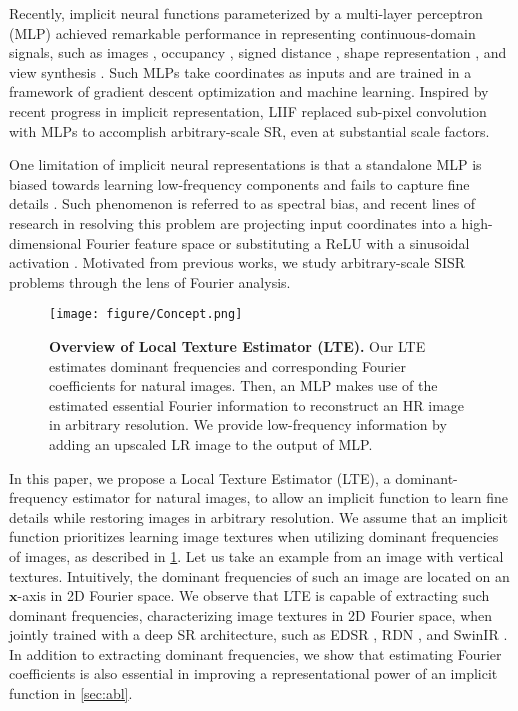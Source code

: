 \documentclass[10pt,twocolumn,letterpaper]{article}
\begin{document}
Recently, implicit neural functions parameterized by a multi-layer perceptron (MLP) achieved remarkable performance in representing continuous-domain signals, such as images \cite{chen2021learning}, occupancy \cite{Occupancy_Networks}, signed distance \cite{Park_2019_CVPR}, shape representation \cite{Local_Implicit_Grid_CVPR20}, and view synthesis \cite{sitzmann2019srns,mildenhall2020nerf}. Such MLPs take coordinates as inputs and are trained in a framework of gradient descent optimization and machine learning. Inspired by recent progress in implicit representation, LIIF \cite{chen2021learning} replaced sub-pixel convolution with MLPs to accomplish arbitrary-scale SR, even at substantial scale factors.

One limitation of implicit neural representations is that a standalone MLP is biased towards learning low-frequency components \cite{DBLP:conf/icml/RahamanBADLHBC19} and fails to capture fine details \cite{tancik2020fourfeat}. Such phenomenon is referred to as spectral bias, and recent lines of research in resolving this problem are projecting input coordinates into a high-dimensional Fourier feature space \cite{mildenhall2020nerf, tancik2020fourfeat} or substituting a ReLU with a sinusoidal activation \cite{sitzmann2019siren}. Motivated from previous works, we study arbitrary-scale SISR problems through the lens of Fourier analysis.






\begin{figure}[t]
\centering
\texttt{[image: figure/Concept.png]}
\vspace{-10pt}
\caption{\textbf{Overview of Local Texture Estimator (LTE).} Our LTE estimates dominant frequencies and corresponding Fourier coefficients for natural images. Then, an MLP makes use of the estimated essential Fourier information to reconstruct an HR image in arbitrary resolution. We provide low-frequency information by adding an upscaled LR image to the output of MLP.}
\label{fig:concept}
\vspace{-10pt}
\end{figure}

In this paper, we propose a Local Texture Estimator (LTE), a dominant-frequency estimator for natural images, to allow an implicit function to learn fine details while restoring images in arbitrary resolution. We assume that an implicit function prioritizes learning image textures when utilizing dominant frequencies of images, as described in \cref{fig:concept}. Let us take an example from an image with vertical textures. Intuitively, the dominant frequencies of such an image are located on an $\mathbf x$-axis in 2D Fourier space. We observe that LTE is capable of extracting such dominant frequencies, characterizing image textures in 2D Fourier space, when jointly trained with a deep SR architecture, such as EDSR \cite{Lim_2017_CVPR_Workshops}, RDN \cite{zhang2018residual}, and SwinIR \cite{liang2021swinir}. In addition to extracting dominant frequencies, we show that estimating Fourier coefficients is also essential in improving a representational power of an implicit function in \cref{sec:abl}.
\end{document}

